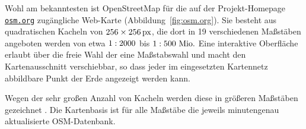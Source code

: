 \documentclass[../main/thesis.tex]{subfiles}
\begin{document}
Wohl am bekanntesten ist OpenStreetMap für die auf der Projekt-Homepage \href{https://www.openstreetmap.org/}{\nolinkurl{osm.org}} zugängliche Web-Karte (Abbildung~\ref{fig:osm.org}).
Sie besteht aus quadratischen Kacheln  von $256\times\unit[256]{px}$, die dort in 19 verschiedenen Maßstäben angeboten werden von etwa $1 \nobreak : \nobreak 2000$ bis $1 \nobreak : \nobreak 500~\unit{Mio.}$ 
Eine interaktive Oberfläche erlaubt über die freie Wahl der  eine Maßstabswahl und macht den Kartenausschnitt verschiebbar, so dass jeder im eingesetzten Kartennetz abbildbare Punkt der Erde angezeigt werden kann.



Wegen der sehr großen Anzahl von Kacheln werden diese in größeren Maßstäben  gezeichnet .
Die Kartenbasis ist für alle Maßstäbe die jeweils minutengenau aktualisierte OSM-Datenbank.
\end{document}
